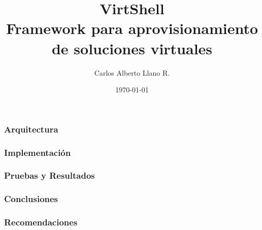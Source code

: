 \documentclass[xcolor=svgnames]{beamer}
\title[VirtShell]{VirtShell \\ Framework para aprovisionamiento de soluciones virtuales}
\author{Carlos Alberto Llano R.}
\date{\today}
\begin{document}
\frame[plain]{\titlepage}
\begin{frame}
	\frametitle{Arquitectura}
\end{frame}
\begin{frame}
        \frametitle{Implementación}
\end{frame}
\begin{frame}
        \frametitle{Pruebas y Resultados}
\end{frame}
\begin{frame}
        \frametitle{Conclusiones}
\end{frame}
\begin{frame}
        \frametitle{Recomendaciones}
\end{frame}
\end{document}
